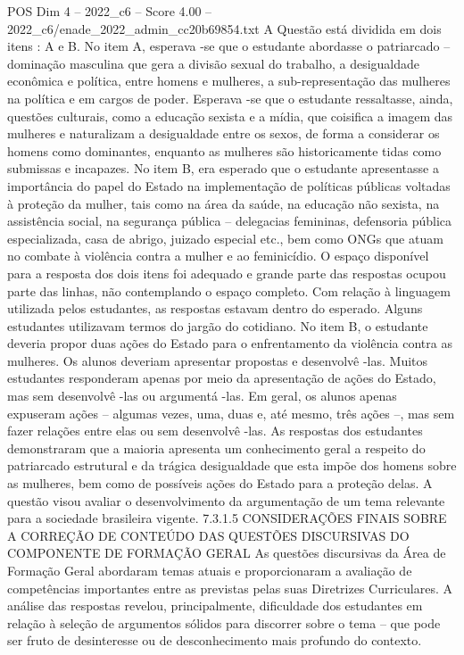 \begin{textsample}{POS Dim 4 – 2022\_c6 – Score 4.00 – 2022\_c6/enade\_2022\_admin\_cc20b69854.txt}
A Questão está dividida em dois itens : A e B.
No item A, esperava -se que o estudante abordasse o patriarcado – dominação masculina que gera a divisão sexual do trabalho, a desigualdade econômica e política, entre homens e mulheres, a sub-representação das mulheres na política e em cargos de poder.
Esperava -se que o estudante ressaltasse, ainda, questões culturais, como a educação sexista e a mídia, que coisifica a imagem das mulheres e naturalizam a desigualdade entre os sexos, de forma a considerar os homens como dominantes, enquanto as mulheres são historicamente tidas como submissas e incapazes.
No item B, era esperado que o estudante apresentasse a importância do papel do Estado na implementação de políticas públicas voltadas à proteção da mulher, tais como na área da saúde, na educação não sexista, na assistência social, na segurança pública – delegacias femininas, defensoria pública especializada, casa de abrigo, juizado especial etc., bem como ONGs que atuam no combate à violência contra a mulher e ao feminicídio.
O espaço disponível para a resposta dos dois itens foi adequado e grande parte das respostas ocupou parte das linhas, não contemplando o espaço completo.
Com relação à linguagem utilizada pelos estudantes, as respostas estavam dentro do esperado.
Alguns estudantes utilizavam termos do jargão do cotidiano.
No item B, o estudante deveria propor duas ações do Estado para o enfrentamento da violência contra as mulheres.
Os alunos deveriam apresentar propostas e desenvolvê -las.
Muitos estudantes responderam apenas por meio da apresentação de ações do Estado, mas sem desenvolvê -las ou argumentá -las.
Em geral, os alunos apenas expuseram ações – algumas vezes, uma, duas e, até mesmo, três ações –, mas sem fazer relações entre elas ou sem desenvolvê -las.
As respostas dos estudantes demonstraram que a maioria apresenta um conhecimento geral a respeito do patriarcado estrutural e da trágica desigualdade que esta impõe dos homens sobre as mulheres, bem como de possíveis ações do Estado para a proteção delas.
A questão visou avaliar o desenvolvimento da argumentação de um tema relevante para a sociedade brasileira vigente. 7.3.1.5 CONSIDERAÇÕES FINAIS SOBRE A CORREÇÃO DE CONTEÚDO DAS QUESTÕES DISCURSIVAS DO COMPONENTE DE FORMAÇÃO GERAL As questões discursivas da Área de Formação Geral abordaram temas atuais e proporcionaram a avaliação de competências importantes entre as previstas pelas suas Diretrizes Curriculares.
A análise das respostas revelou, principalmente, dificuldade dos estudantes em relação à seleção de argumentos sólidos para discorrer sobre o tema – que pode ser fruto de desinteresse ou de desconhecimento mais profundo do contexto.

\end{textsample}
